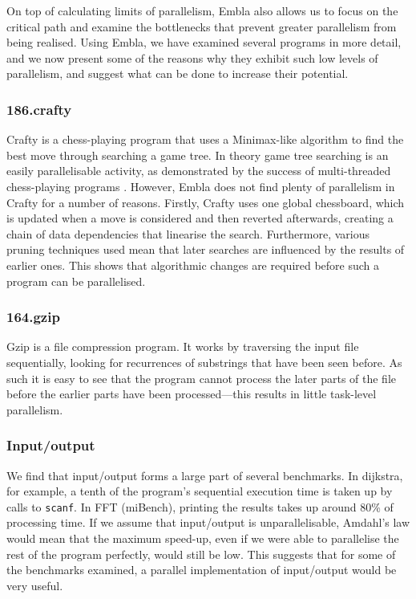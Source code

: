 On top of calculating limits of parallelism, Embla also allows us to focus on the critical path and examine the bottlenecks that prevent greater parallelism from being realised.
Using Embla, we have examined several programs in more detail, and we now present some of the reasons why they exhibit such low levels of parallelism, and suggest what can be done to increase their potential.

\subsubsection{186.crafty}

Crafty is a chess-playing program that uses a Minimax-like algorithm to find the best move through searching a game tree.
In theory game tree searching is an easily parallelisable activity, as demonstrated by the success of multi-threaded chess-playing programs \cite{Dailey01usingcilk}.
However, Embla does not find plenty of parallelism in Crafty for a number of reasons.
Firstly, Crafty uses one global chessboard, which is updated when a move is considered and then reverted afterwards, creating a chain of data dependencies that linearise the search.
Furthermore, various pruning techniques used mean that later searches are influenced by the results of earlier ones.
This shows that algorithmic changes are required before such a program can be parallelised.

\subsubsection{164.gzip}

Gzip is a file compression program.
It works by traversing the input file sequentially, looking for recurrences of substrings that have been seen before.
As such it is easy to see that the program cannot process the later parts of the file before the earlier parts have been processed---this results in little task-level parallelism.

\subsubsection{Input/output}

We find that input/output forms a large part of several benchmarks.
In dijkstra, for example, a tenth of the program's sequential execution time is taken up by calls to \texttt{scanf}.
In FFT (miBench), printing the results takes up around 80\% of processing time.
If we assume that input/output is unparallelisable, Amdahl's law would mean that the maximum speed-up, even if we were able to parallelise the rest of the program perfectly, would still be low.
This suggests that for some of the benchmarks examined, a parallel implementation of input/output would be very useful.

